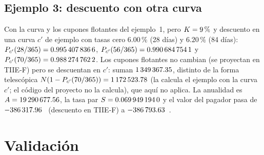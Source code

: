 \subsection*{Ejemplo 3: descuento con otra curva}

Con la curva y los cupones flotantes del ejemplo~1, pero $\K=9\,\%$ y descuento en una curva $c'$ de ejemplo
con tasas cero $6.00\,\%$ (28 días) y $6.20\,\%$ (84 días): $\DF{c'}{28/365}=\verif{cap03-df-col-28}{0.9954078366}$,
$\DF{c'}{56/365}=\verif{cap03-df-col-56}{0.9906847541}$ y $\DF{c'}{70/365}=\verif{cap03-df-col-70}{0.9882747622}$. Los
cupones flotantes no cambian (se proyectan en TIIE-F) pero se descuentan en $c'$: suman
$\verif{cap03-flo-descontado-col}{1349367.35}$, distinto de la forma telescópica
$\Nom(1-\DF{c'}{70/365})=\verif{cap03-flo-telescopica-col}{1172523.78}$ (la calcula el ejemplo con la curva $c'$; el
código del proyecto no la calcula), que aquí no aplica. La anualidad es
$\Ann=\verif{cap03-anualidad-col}{19290677.56}$, la tasa par
$\Spar=\verif{cap03-tasa-par-col}{0.0699491940}$ y el valor del pagador pasa de
$\verif{cap03-pv-un-curva}{-386317.96}$~\MXN{} (descuento en TIIE-F) a $\verif{cap03-pv-col}{-386793.63}$~\MXN{}.

\section{Validación}\label{sec:cap03-validacion}

